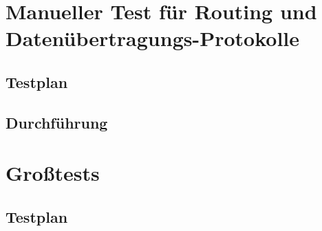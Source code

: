 


\clearpage
\section{Manueller Test für Routing und Datenübertragungs-Protokolle}
\subsection{Testplan}


\subsection{Durchführung}


\section{Großtests}
\subsection{Testplan}



